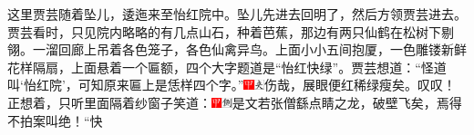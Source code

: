 这里贾芸随着坠儿，逶迤来至怡红院中。坠儿先进去回明了，然后方领贾芸进去。贾芸看时，只见院内略略的有几点山石，种着芭蕉，那边有两只仙鹤在松树下剔翎。一溜回廊上吊着各色笼子，各色仙禽异鸟。上面小小五间抱厦，一色雕镂新鲜花样隔扇，上面悬着一个匾额，四个大字题道是“怡红快绿”。贾芸想道：“怪道叫‘怡红院’，可知原来匾上是恁样四个字。”{\includegraphics[width=3mm]{../Images/00002}\includegraphics[width=3mm]{../Images/00012}\footnotesize \kaishu 伤哉，展眼便红稀绿瘦矣。叹叹！}正想着，只听里面隔着纱窗子笑道：{\includegraphics[width=3mm]{../Images/00002}\includegraphics[width=3mm]{../Images/00011}\footnotesize \kaishu 是文若张僧繇点睛之龙，破壁飞矣，焉得不拍案叫绝！}“快